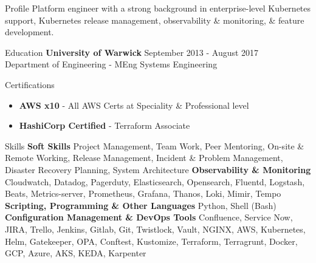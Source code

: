 \documentclass{resume} %
\begin{document}

\begin{rSection}{Profile}
\smallbreak
\normalfont Platform engineer with a strong background in enterprise-level Kubernetes support, Kubernetes release management, observability \& monitoring, \& feature development. \newline
\end{rSection}


\begin{rSection}{Education}
\smallbreak
{\bf University of Warwick} \hfill { September 2013 - August 2017}
\\ \normalfont Department of Engineering - MEng Systems Engineering
\end{rSection}

\begin{rSection}{Certifications}
\begin{itemize}[leftmargin=1em, nosep]
\item \textbf{AWS x10} - \normalfont All AWS Certs at Speciality \& Professional level
\item \textbf{HashiCorp Certified} - \normalfont Terraform Associate
\end{itemize}
\end{rSection}

\begin{rSection}{Skills}
\smallbreak
{\bf Soft Skills} \newline
Project Management, Team Work, Peer Mentoring, On-site \& Remote Working, Release Management, Incident \& Problem Management, Disaster Recovery Planning, System Architecture \newline
{\bf Observability \& Monitoring} \newline
Cloudwatch, Datadog, Pagerduty, Elasticsearch, Opensearch, Fluentd, Logstash, Beats, Metrics-server, Prometheus, Grafana, Thanos, Loki, Mimir, Tempo \newline
{\bf Scripting, Programming \& Other Languages} \newline
Python, Shell (Bash) \newline
{\bf Configuration Management \& DevOps Tools} \newline
Confluence, Service Now, JIRA, Trello, Jenkins, Gitlab, Git, Twistlock, Vault, NGINX, AWS, Kubernetes, Helm, Gatekeeper, OPA, Conftest, Kustomize, Terraform, Terragrunt, Docker, GCP, Azure, AKS, KEDA, Karpenter
\end{rSection}
\end{document}
